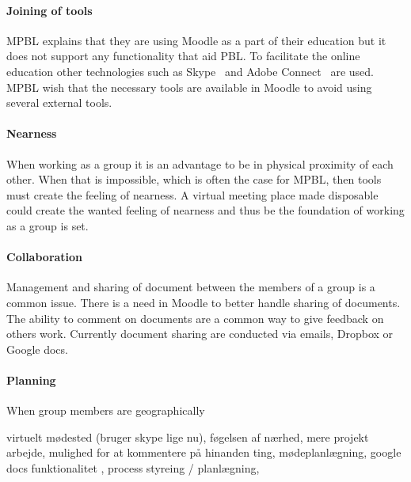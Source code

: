 \paragraph{Joining of tools} MPBL explains that they are using Moodle as a part of their education but it does not support any functionality that aid PBL. 
To facilitate the online education other technologies such as Skype~\cite{skype} and Adobe Connect~\cite{adobe} are used. 
MPBL wish that the necessary tools are available in Moodle to avoid using several external tools.     

\paragraph{Nearness} When working as a group it is an advantage to be in physical proximity of each other.
When that is impossible, which is often the case for MPBL, then tools must create the feeling of nearness. 
A virtual meeting place made disposable could create the wanted feeling of nearness and thus be the foundation of working as a group is set. 

\paragraph{Collaboration} Management and sharing of document between the members of a group is a common issue. 
There is a need in Moodle to better handle sharing of documents. The ability to comment on documents are a common way to give feedback on others work. 
Currently document sharing are conducted via emails, Dropbox\cite{dropbox} or Google docs\cite{googledocs}.


\paragraph{Planning} When group members are geographically 






virtuelt mødested (bruger skype lige nu), føgelsen af nærhed, mere projekt arbejde, mulighed for at kommentere på hinanden ting, mødeplanlægning, google docs funktionalitet , process styreing / planlægning, 


